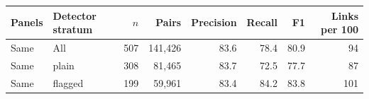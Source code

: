 \begin{tabular}{@{}llrrrrrr@{}}
\toprule
Panels & Detector stratum & $n$ & Pairs & Precision & Recall & F1 & Links per 100 \\
\midrule
Same & All & 507 & 141,426 & 83.6 & 78.4 & 80.9 & 94 \\
Same & plain & 308 & 81,465 & 83.7 & 72.5 & 77.7 & 87 \\
Same & flagged & 199 & 59,961 & 83.4 & 84.2 & 83.8 & 101 \\
\bottomrule
\end{tabular}
